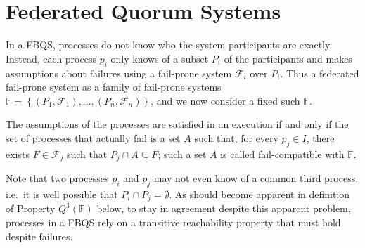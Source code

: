 \documentclass[11pt]{article}
\begin{document}


\section{Federated Quorum Systems}

In a FBQS, processes do not know who the system participants are exactly. Instead, each process $p_i$ only knows of a subset $P_i$ of the participants and makes assumptions about failures using a fail-prone system $\mathcal{F}_i$ over $P_i$. Thus a federated fail-prone system as a family of fail-prone systems $\mathbb{F}=\left\{\left(P_1,\mathcal{F}_1\right),...,\left(P_n,\mathcal{F}_n\right)\right\}$, and we now consider a fixed such $\mathbb{F}$.

The assumptions of the processes are satisfied in an execution if and only if the set of processes that actually fail is a set $A$ such that, for every $p_j\in I$, there exists $F\in\mathcal{F}_j$ such that $P_j\cap A \subseteq F$; such a set $A$ is called fail-compatible with $\mathbb{F}$.%


Note that two processes $p_i$ and $p_j$ may not even know of a common third process, i.e.\ it is well possible that $P_i\cap P_j=\emptyset$. As should become apparent in definition of Property $Q^3(\mathbb{F})$ below, to stay in agreement despite this apparent problem, processes in a FBQS rely on a transitive reachability property that must hold despite failures.
\end{document}
